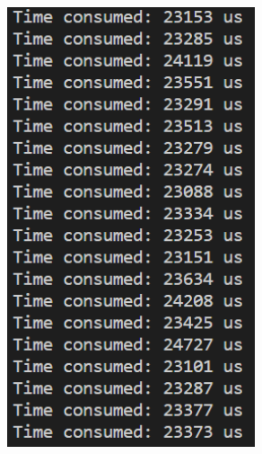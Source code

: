 \documentclass[a4paper,12pt]{article}
\begin{document}
\begin{figure}[H]
{\begin{minipage}[t]{0.4\textwidth}
        \includegraphics[width = 0.65\textwidth]{Optimized C++ 2sum.png}
    \end{minipage}}
\end{figure}
\end{document}
